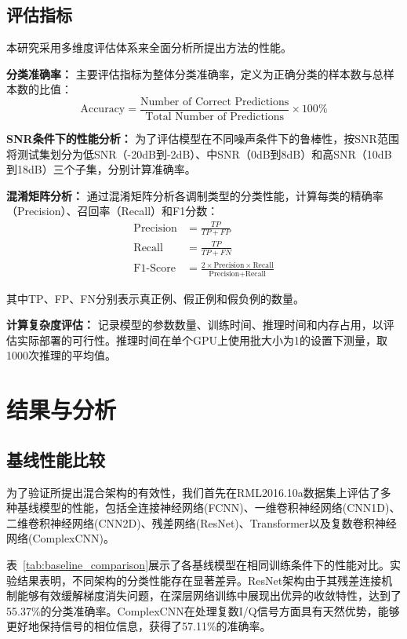 \documentclass[conference]{IEEEtran}
\begin{document}
\subsection{评估指标}

本研究采用多维度评估体系来全面分析所提出方法的性能。

\textbf{分类准确率：}
主要评估指标为整体分类准确率，定义为正确分类的样本数与总样本数的比值：
\begin{equation}
\text{Accuracy} = \frac{\text{Number of Correct Predictions}}{\text{Total Number of Predictions}} \times 100\%
\end{equation}

\textbf{SNR条件下的性能分析：}
为了评估模型在不同噪声条件下的鲁棒性，按SNR范围将测试集划分为低SNR（-20dB到-2dB）、中SNR（0dB到8dB）和高SNR（10dB到18dB）三个子集，分别计算准确率。

\textbf{混淆矩阵分析：}
通过混淆矩阵分析各调制类型的分类性能，计算每类的精确率（Precision）、召回率（Recall）和F1分数：
\begin{align}
\text{Precision} &= \frac{TP}{TP + FP} \\
\text{Recall} &= \frac{TP}{TP + FN} \\
\text{F1-Score} &= \frac{2 \times \text{Precision} \times \text{Recall}}{\text{Precision} + \text{Recall}}
\end{align}

其中TP、FP、FN分别表示真正例、假正例和假负例的数量。

\textbf{计算复杂度评估：}
记录模型的参数数量、训练时间、推理时间和内存占用，以评估实际部署的可行性。推理时间在单个GPU上使用批大小为1的设置下测量，取1000次推理的平均值。

\section{结果与分析}

\subsection{基线性能比较}

为了验证所提出混合架构的有效性，我们首先在RML2016.10a数据集上评估了多种基线模型的性能，包括全连接神经网络(FCNN)、一维卷积神经网络(CNN1D)、二维卷积神经网络(CNN2D)、残差网络(ResNet)、Transformer以及复数卷积神经网络(ComplexCNN)。

表~\ref{tab:baseline_comparison}展示了各基线模型在相同训练条件下的性能对比。实验结果表明，不同架构的分类性能存在显著差异。ResNet架构由于其残差连接机制能够有效缓解梯度消失问题，在深层网络训练中展现出优异的收敛特性，达到了55.37\%的分类准确率。ComplexCNN在处理复数I/Q信号方面具有天然优势，能够更好地保持信号的相位信息，获得了57.11\%的准确率。
\end{document}
